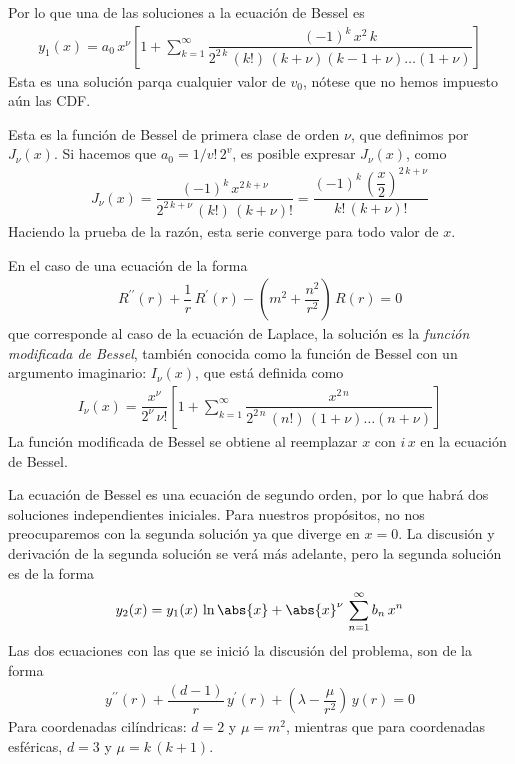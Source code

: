 Por lo que una de las soluciones a la ecuación de Bessel es
\begin{align*}
y_{1} (x) = a_{0} \, x^{\nu} \left[ 1 +  \sum_{k=1}^{\infty}  \dfrac{(-1)^{k} \, x^{2} \, k}{2^{2 \, k} \, (k!) \, (k + \nu)(k - 1 + \nu) \ldots (1 + \nu)} \right]
\end{align*}
Esta es una solución parqa cualquier valor de $v_{0}$, nótese que no hemos impuesto aún las CDF.
\par
Esta es la función de Bessel de primera clase de orden $\nu$, que definimos por $J_{\nu} (x)$. Si hacemos que $a_{0} = 1 / v! \, 2^{v}$, es posible expresar $J_{\nu} (x)$, como
\begin{align}
J_{\nu} (x) = \dfrac{(-1)^{k} \, x^{2 \, k + \nu}}{2^{2 \, k + \nu} \, (k!) \, (k + \nu)!} = \dfrac{(-1)^{k} \, \left( \dfrac{x}{2} \right)^{2 \, k + \nu}}{k! \, (k + \nu)!}
\label{eq:ecuacion_013}
\end{align}
Haciendo la prueba de la razón, esta serie converge para todo valor de $x$.
\par
En el caso de una ecuación de la forma
\begin{align*}
R^{\prime \prime} (r) + \dfrac{1}{r} \, R^{\prime} (r) - \left( m^{2} + \dfrac{n^{2}}{r^{2}} \right) \, R (r) = 0
\end{align*}
que corresponde al caso de la ecuación de Laplace, la solución es la \emph{función modificada de Bessel}, también conocida como la función de Bessel con un argumento imaginario: $I_{\nu} (x)$, que está definida como
\begin{align*}
I_{\nu} (x) = \dfrac{x^{\nu}}{2^{\nu} \, \nu!} \left[ 1 +  \sum_{k=1}^{\infty} \dfrac{x^{2 \, n}}{2^{2 \, n} \, (n!) \, (1 + \nu) \ldots (n +\nu)} \right]
\end{align*}
La función modificada de Bessel se obtiene al reemplazar $x$ con $i \, x$ en la ecuación de Bessel.
\par
La ecuación de Bessel es una ecuación de segundo orden, por lo que habrá dos soluciones independientes iniciales. Para nuestros propósitos, no nos preocuparemos con la segunda solución ya que diverge en $x = 0$. La discusión y derivación de la segunda solución se verá más adelante, pero la segunda solución es de la forma
\begin{align*}
y_{2} (x) = y_{1} (x) \, \ln \abs{x} + \abs{x}^{\nu} \, \sum_{n=1}^{\infty} b_{n} \, x^{n}
\end{align*}
Las dos ecuaciones con las que se inició la discusión del problema, son de la forma
\begin{align*}
y^{\prime \prime} (r)  + \dfrac{(d - 1)}{r} \, y^{\prime} (r)+ \left( \lambda - \dfrac{\mu}{r^{2}} \right) \, y(r) = 0
\end{align*}
Para coordenadas cilíndricas: $d = 2$ y $\mu = m^{2}$, mientras que para coordenadas esféricas, $d = 3$ y $\mu = k \, (k + 1)$.
